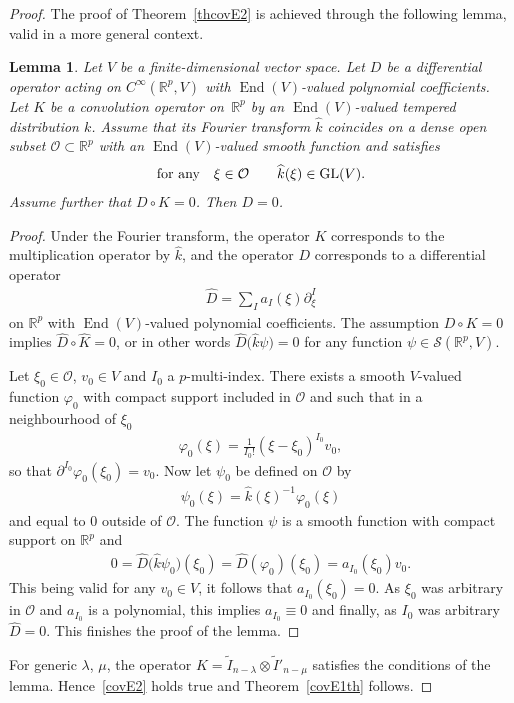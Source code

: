 \documentclass[pdftex]{sigma}
\DeclareMathOperator{\End}{End}
\numberwithin{equation}{section}
\newtheorem{lem}[theor]{Lemma}
\begin{document}
\begin{proof}
The proof of Theorem~\ref{thcovE2} is achieved through the following lemma, valid in a more general context.

\begin{lem} Let $V$ be a finite-dimensional vector space. Let $D$ be a differential operator acting on $C^\infty(\mathbb R^p, V)$ with $\End(V)$-valued polynomial coefficients. Let $K$ be a convolution operator on~$\mathbb R^p$ by an $\End(V)$-valued tempered distribution $k$. Assume that its Fourier transform $\widehat k$ coincides on a dense open subset $\mathcal O\subset \mathbb R^p$ with an $\End(V)$-valued smooth function and satisfies
\begin{gather*}
\text{for any}\quad \xi\in \mathcal O \qquad \widehat{k}(\xi) \in {\rm GL}(V).
\end{gather*}
Assume further that $D\circ K=0$. Then $D=0$.
\end{lem}
\begin{proof} Under the Fourier transform, the operator $K$ corresponds to the multiplication operator by $\widehat k$, and the operator $D$ corresponds to a differential operator \begin{gather*}\widehat D= \sum_I a_I(\xi) \partial_\xi^I\end{gather*}
 on $\mathbb R^p$ with $\End(V)$-valued polynomial coefficients. The assumption $D\circ K=0$ implies $\widehat D \circ \widehat K = 0$, or in other words $\widehat D\big(\widehat k \psi\big) = 0$ for any function $\psi\in \mathcal S(\mathbb R^p, V)$.

Let $\xi_0\in \mathcal O$, $v_0\in V$ and $I_0$ a $p$-multi-index. There exists a smooth $V$-valued function $\varphi_0$ with compact support included in $\mathcal O$ and such that in a neighbourhood of $\xi_0$
\begin{gather*}
\varphi_0(\xi) =\frac{1}{I_0!} (\xi-\xi_0)^{I_0} v_0,
\end{gather*}
so that $\partial^{I_0}\varphi_0(\xi_0) = v_0$. Now let $\psi_0$ be defined on $\mathcal O$ by
\begin{gather*}
\psi_0(\xi) = \widehat k (\xi) ^{-1} \varphi_0(\xi)
\end{gather*}
and equal to $0$ outside of $\mathcal O$. The function $\psi$ is a smooth function with compact support on $\mathbb R^p$ and
\begin{gather*}
0=\widehat D \big(\widehat k \psi_0\big) (\xi_0) = \widehat D(\varphi_0)(\xi_0) = a_{I_0}(\xi_0) v_0.
\end{gather*}
This being valid for any $v_0\in V$, it follows that $a_{I_0}(\xi_0) = 0$. As $\xi_0$ was arbitrary in $\mathcal O$ and $a_{I_0}$ is a polynomial, this implies $a_{I_0}\equiv 0$ and finally, as $I_0$ was arbitrary $\widehat D=0$. This finishes the proof of the lemma.
\end{proof}

For generic $\lambda$, $\mu$, the operator $K=\widetilde I_{n-\lambda}\otimes \widetilde I'_{n-\mu}$ satisfies the conditions of the lemma. Hence~\eqref{covE2} holds true and Theorem~\ref{covE1th} follows.
\end{proof}
\end{document}
